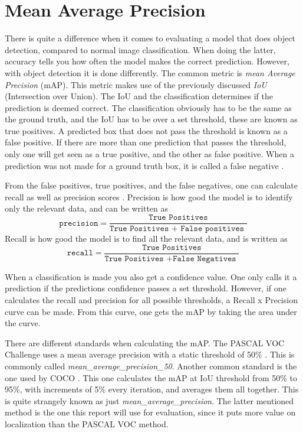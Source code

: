 \section{Mean Average Precision}
\label{sec:mAP}
There is quite a difference when it comes to evaluating a model that does object detection,  compared to normal image classification. When doing the latter, accuracy tells you how often the model makes the correct prediction. However, with object detection it is done differently. The common metric is \textit{mean Average Precision} (mAP).  This metric makes use of the previously discussed \textit{IoU} (Intersection over Union). The IoU and the classification determines if the prediction is deemed correct. The classification obviously has to be the same as the ground truth, and the IoU has to be over a set threshold, these are known as true positives. A predicted box that does not pass the threshold is known as a false positive. If there are more than one prediction that passes the threshold, only one will get seen as a true positive, and the other as false positive. When a prediction was not made for a ground truth box, it is called a false negative \cite{turiAdvanced}.

From the false positives, true positives, and the false negatives, one can calculate recall as well as precision scores \cite{rafaelpadilla}.  Precision is how good the model is to identify only the relevant data, and can be written as
\[ \texttt{precision} = \frac{\texttt{True Positives}}{\texttt{True Positives + False positives }}\]
Recall is how good the model is to find all the relevant data, and is written as 
\[ \texttt{recall} = \frac{\texttt{True Positives}}{\texttt{True Positives +False Negatives }}\]

 When a classification is made you also get a confidence value. One only calls it a prediction if the predictions confidence passes a set threshold. However, if one calculates the recall and precision for all possible thresholds, a Recall x Precision curve can be made. From this curve, one gets the mAP by taking the area under the curve.

There are different standards when calculating the mAP. The PASCAL VOC Challenge uses a mean average precision with a static threshold of 50\%
 \cite{PASCAL}. This is commonly called \textit{mean\_average\_precision\_50}. Another common standard is the one used by COCO  \cite{COCO}. This one calculates the mAP at IoU threshold from 50\%  to 95\%, with increments of 5\% every iteration, and averages them all together. This is quite strangely known as just \textit{mean\_average\_precision}. The latter mentioned method is the one this report will use for evaluation, since it puts more value on localization than the PASCAL VOC method.

